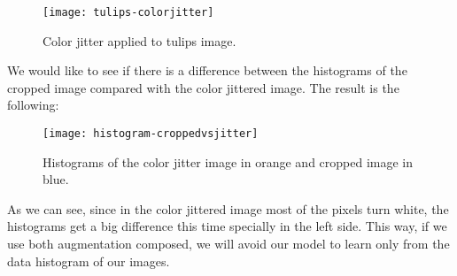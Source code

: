\begin{figure}[htp] 
    \centering
    \texttt{[image: tulips-colorjitter]}%
        \label{fig:color:jitter}%
        \caption{Color jitter applied to tulips image.}
\end{figure}

We would like to see if there is a difference between the histograms of the cropped image compared with the color jittered image. The result is the following:

\begin{figure}[htp] 
    \centering
    \texttt{[image: histogram-croppedvsjitter]}%
        \label{fig:color:jitter}%
        \caption{Histograms of the color jitter image in orange and cropped image in blue.}
\end{figure}

As we can see, since in the color jittered image most of the pixels turn white, the histograms get a big difference this time specially in the left side. This way, if we use both augmentation composed, we will avoid our model to learn only from the data histogram of our images.

